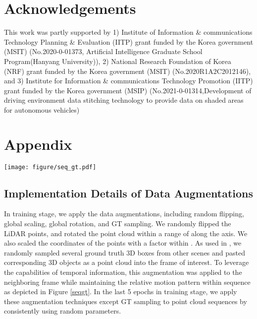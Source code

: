 \documentclass[letterpaper]{article} \usepackage{aaai23}  \usepackage{times}  \usepackage{helvet}  \usepackage{courier}  \usepackage[hyphens]{url}  \usepackage{graphicx} \urlstyle{rm} \def\UrlFont{\rm}  \usepackage{natbib}  \usepackage{caption} \frenchspacing  \setlength{\pdfpagewidth}{8.5in} \usepackage{algorithm}
\begin{document}
\newpage

\section{Acknowledgements}
This work was partly supported by 1) Institute of Information \& communications Technology Planning \& Evaluation (IITP) grant funded by the Korea government (MSIT) (No.2020-0-01373, Artificial Intelligence Graduate School Program(Hanyang University)), 2) National Research Foundation of Korea (NRF) grant funded by the Korea government (MSIT) (No.2020R1A2C2012146), and 3) Institute for Information \& communications Technology Promotion (IITP) grant funded by the Korea government (MSIP) (No.2021-0-01314,Development of driving environment data stitching technology to provide data on shaded areas for autonomous vehicles)



\newpage

\onecolumn
\renewcommand{\thesection}{\Alph{section}}
\setcounter{figure}{0}
\setcounter{table}{0}
\section{Appendix}
\begin{figure*}[h]
    \centerline{\texttt{[image: figure/seq\_gt.pdf]}}
	\caption {\textbf{Visualization of GT sampling.} We implement GT sampling by keeping relative motion of objects within sequence.}
	\label{seqgt}
\end{figure*}
\subsection{Implementation Details of Data Augmentations}
In training stage, we apply the data augmentations, including random flipping, global scaling, global rotation, and GT sampling\cite{second}. We randomly flipped the LiDAR points, and rotated the point cloud within a range of  along the  axis. We also scaled the coordinates of the points with a factor within . 
As used in \cite{second}, we randomly sampled several ground truth 3D boxes from other scenes and pasted corresponding 3D objects as a point cloud into the frame of interest. To leverage the capabilities of temporal information, this augmentation was applied to the neighboring frame while maintaining the relative motion pattern within sequence as depicted in Figure \ref{seqgt}.
In the last 5 epochs in training stage, we apply these augmentation techniques except GT sampling to point cloud sequences by consistently using random parameters.
\end{document}
